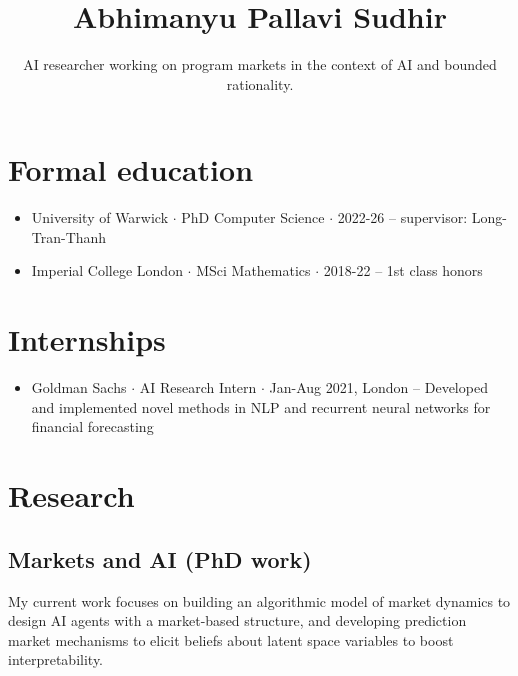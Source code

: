 \documentclass{article}
\title{\Large\bf Abhimanyu Pallavi Sudhir}
\subtitle{AI researcher working on program markets in the context of AI and bounded rationality. \\ %
\vspace{-2em}}
\begin{document}
\begingroup
\let\center\flushleft
\let\endcenter\endflushleft
\maketitle
\endgroup


\section*{Formal education}

\begin{itemize}

    \item University of Warwick $\cdot$ PhD Computer Science $\cdot$ 2022-26 -- supervisor: Long-Tran-Thanh %

    \item Imperial College London $\cdot$ MSci Mathematics $\cdot$ 2018-22 -- 1st class honors

\end{itemize}

\section*{Internships}

\begin{itemize}

    \item Goldman Sachs $\cdot$ AI Research Intern $\cdot$ Jan-Aug 2021, London -- Developed and implemented novel methods in NLP and recurrent neural networks for financial forecasting

\end{itemize}

\section*{Research}

\subsection*{Markets and AI (PhD work)}

My current work focuses on building an algorithmic model of market dynamics to design AI agents with a market-based structure, and developing prediction market mechanisms to elicit beliefs about latent space variables to boost interpretability.
\end{document}
